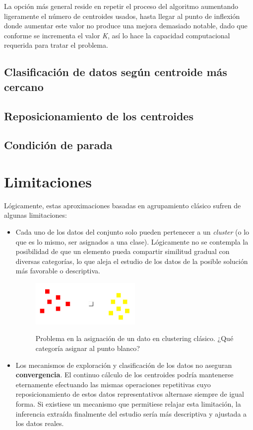 \documentclass[]{report}
\begin{document}
				La opción más general reside en repetir el proceso del algoritmo aumentando ligeramente el número de centroides usados, hasta llegar al punto de inflexión donde aumentar este valor no produce una mejora demasiado notable, dado que conforme se incrementa el valor \textit{K}, así lo hace la capacidad computacional requerida para tratar el problema.
				
			\subsection{Clasificación de datos según centroide más cercano}
			
			\subsection{Reposicionamiento de los centroides}
			
			\subsection{Condición de parada}
				
		\section{Limitaciones}
		
			Lógicamente, estas aproximaciones basadas en agrupamiento clásico sufren de algunas limitaciones:
			
			\begin{itemize}
				\item Cada uno de los datos del conjunto solo pueden pertenecer a un \textit{cluster} (o lo que es lo mismo, ser asignados a una clase). Lógicamente no se contempla la posibilidad de que un elemento pueda compartir similitud gradual con diversas categorías, lo que aleja el estudio de los datos de la posible solución más favorable o descriptiva.
				
				\begin{figure}[h]
					\centering
					\includegraphics[width=0.5\textwidth]{Artboard1.jpg}
					\label{clustering2}
					\caption{Problema en la asignación de un dato en clustering clásico. ¿Qué categoría asignar al punto blanco?}
				\end{figure}
			
				\item Los mecanismos de exploración y clasificación de los datos no aseguran \textbf{convergencia}. El continuo cálculo de los centroides podría mantenerse eternamente efectuando las mismas operaciones repetitivas cuyo reposicionamiento de estos datos representativos alternase siempre de igual forma. Si existiese un mecanismo que permitiese relajar esta limitación, la inferencia extraída finalmente del estudio sería más descriptiva y ajustada a los datos reales.
			\end{itemize}
	
\end{document}
